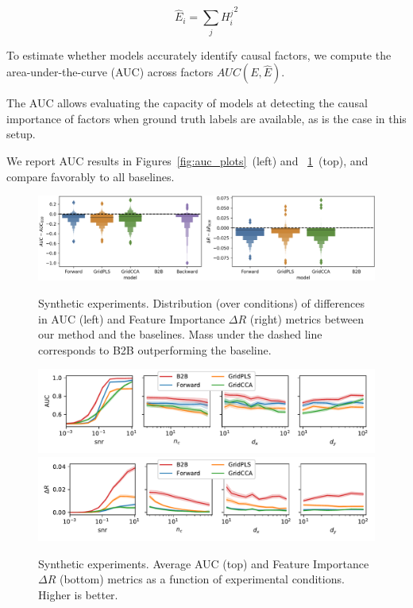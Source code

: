 \begin{equation} \hat E_i = \sum_j {H^j_i}^2 \end{equation}

To estimate whether models accurately identify causal factors, we compute the
area-under-the-curve (AUC) across factors $AUC(E, \hat E)$.

The AUC allows evaluating the capacity of models at detecting the causal
importance of factors when ground truth labels are available, as is the case in
this setup.

We report AUC results in Figures~\ref{fig:auc_plots}~(left) and ~\ref{fig:percondition}~(top), and compare favorably to all baselines.

\begin{figure}[ht]
  \centering
  \includegraphics[width=\linewidth]{figures/AUC_R.png}
  \vspace{-4ex}
  \caption{Synthetic experiments. Distribution (over conditions) of differences in AUC (left) and Feature Importance $\Delta R$ (right) metrics between our method and the baselines. Mass under the dashed line corresponds to B2B outperforming the baseline. \label{fig:auc_plots}}
  \vspace{2ex}
  \includegraphics[width=\linewidth]{figures/AUC_conditions}
  \includegraphics[width=\linewidth]{figures/R_conditions}
  \vspace{-4ex}
  \caption{Synthetic experiments. Average AUC (top) and Feature Importance $\Delta R$ (bottom) metrics as a function of experimental conditions. Higher is better. \label{fig:percondition}}
\end{figure}


